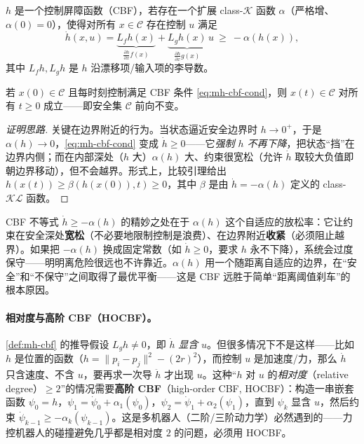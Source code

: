 \begin{definition}\label{def:mh-cbf}
$h$ 是一个控制屏障函数（CBF），若存在一个扩展 class-$\mathcal{K}$ 函数 $\alpha$（严格增、$\alpha(0)=0$），使得对所有 $x\in\mathcal{C}$ 存在控制 $u$ 满足
\begin{equation}
  \dot h(x,u)=\underbrace{L_fh(x)}_{\frac{\partial h}{\partial x}f(x)}+\underbrace{L_gh(x)}_{\frac{\partial h}{\partial x}g(x)}\,u\ \ge\ -\alpha(h(x)),
  \label{eq:mh-cbf-cond}
\end{equation}
其中 $L_fh,L_gh$ 是 $h$ 沿漂移项/输入项的李导数\cite{ames2017cbf}。
\end{definition}

\begin{theorem}[前向不变性]\label{thm:mh-fwd-invariance}
若 $x(0)\in\mathcal{C}$ 且每时刻控制满足 CBF 条件 \cref{eq:mh-cbf-cond}，则 $x(t)\in\mathcal{C}$ 对所有 $t\ge0$ 成立——即安全集 $\mathcal{C}$ 前向不变。
\end{theorem}
\begin{proof}[证明思路]
关键在边界附近的行为。当状态逼近安全边界时 $h\to0^+$，于是 $\alpha(h)\to0$，\cref{eq:mh-cbf-cond} 变成 $\dot h\ge0$——它\emph{强制 $h$ 不再下降}，把状态“挡”在边界内侧；而在内部深处（$h$ 大）$\alpha(h)$ 大、约束很宽松（允许 $\dot h$ 取较大负值即朝边界移动），但不会越界。形式上，比较引理给出 $h(x(t))\ge\beta(h(x(0)),t)\ge0$，其中 $\beta$ 是由 $\dot h=-\alpha(h)$ 定义的 class-$\mathcal{KL}$ 函数。
\end{proof}

\begin{insight}
CBF 不等式 $\dot h\ge-\alpha(h)$ 的精妙之处在于 $\alpha(h)$ 这个自适应的放松率：它让约束在安全深处\textbf{宽松}（不必要地限制控制是浪费）、在边界附近\textbf{收紧}（必须阻止越界）。如果把 $-\alpha(h)$ 换成固定常数（如 $\dot h\ge0$，要求 $h$ 永不下降），系统会过度保守——明明离危险很远也不许靠近。$\alpha(h)$ 用一个随距离自适应的边界，在“安全”和“不保守”之间取得了最优平衡——这是 CBF 远胜于简单“距离阈值刹车”的根本原因。
\end{insight}

\paragraph{相对度与高阶 CBF（HOCBF）。}
\cref{def:mh-cbf} 的推导假设 $L_gh\ne0$，即 $\dot h$ \emph{显含} $u$。但很多情况下不是这样——比如 $h$ 是位置的函数（$h=\|p_i-p_j\|^2-(2r)^2$），而控制 $u$ 是加速度/力，那么 $\dot h$ 只含速度、不含 $u$，要再求一次导 $\ddot h$ 才出现 $u$。这种“$h$ 对 $u$ 的\emph{相对度}（relative degree）$\ge2$”的情况需要\textbf{高阶 CBF}（high-order CBF, HOCBF\cite{xiao2022hocbf}）：构造一串嵌套函数 $\psi_0=h$，$\psi_1=\dot\psi_0+\alpha_1(\psi_0)$，$\psi_2=\dot\psi_1+\alpha_2(\psi_1)$，直到 $\psi_k$ 显含 $u$，然后约束 $\dot\psi_{k-1}\ge-\alpha_k(\psi_{k-1})$。这是多机器人（二阶/三阶动力学）必然遇到的——力控机器人的碰撞避免几乎都是相对度 $2$ 的问题，必须用 HOCBF。

